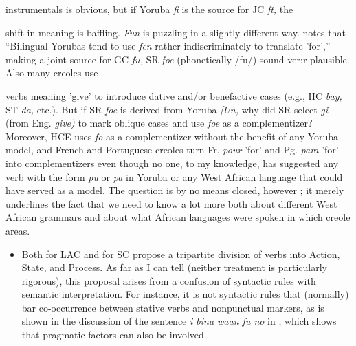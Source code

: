 \begin{itemize}
\begin{itemize}
\begin{itemize}
\begin{itemize}
instrumentals is obvious, but if Yoruba \textit{fi} is the source for JC \textit{ft,} the

shift in meaning is baffling. \textit{Fun} is puzzling in a slightly different way. \citet{Rowlands1969} notes that ``Bilingual Yorubas tend to use \textit{fen} rather indiscriminately to translate 'for','' making a joint source for GC \textit{fu,} SR \textit{foe }(phonetically /fu/) sound ver;r plausible. Also many creoles use


verbs meaning 'give' to introduce dative and/or benefactive cases (e.g., HC \textit{bay,} ST \textit{da,} etc.). But if SR \textit{foe} is derived from Yoruba \textit{[Un,} why did SR select \textit{gi} (from Eng. \textit{give}\textit{)} to mark oblique cases and use \textit{foe} as a complementizer? Moreover, HCE uses \textit{fo} as a complementizer without the benefit of any Yoruba model, and French and Portuguese creoles turn Fr. \textit{pour} 'for' and Pg. \textit{para} 'for' into complementizers even though no one, to my knowledge, has suggested any verb with the form \textit{pu} or \textit{pa} in Yoruba or any West African language that could have served as a model. The question is by no means closed, however ; it merely underlines the fact that we need to know a lot more both about different West African grammars and about what African lan\-guages were spoken in which creole areas.

\begin{itemize}
\item Both \citet{Christie1976} for LAC and \citet{Corne1981} for SC propose a tripartite division of verbs into Action, State, and Process. As far as I can tell (neither treatment is particularly rigorous), this proposal arises from a confusion of syntactic rules with semantic interpretation. For instance, it is not syntactic rules that (normally) bar co-occurrence between stative verbs and nonpunctual markers, as is shown in the discussion of the sentence \textit{i bina waan fu no} in \citet[38]{Bickerton1975}, which shows that pragmatic factors can also be involved.


\end{itemize}
\end{itemize}
\end{itemize}
\end{itemize}
\end{itemize}
